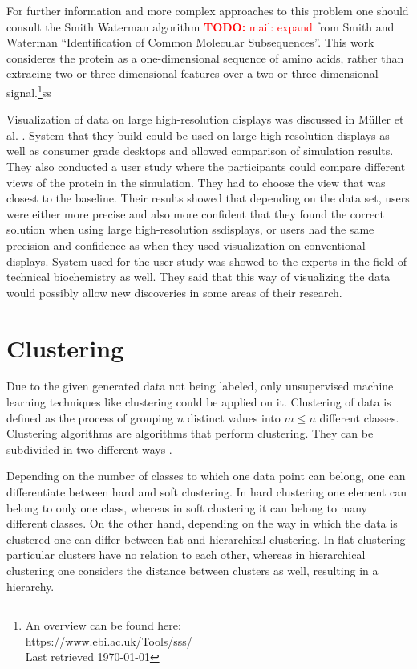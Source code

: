 \documentclass[journal]{vgtc}       %
\newcommand{\todo}[1]{\textcolor{red}{\textbf{TODO:} #1}}
\begin{document}
For further information and more complex approaches to this problem one should consult the Smith Waterman algorithm \todo{mail: expand} from Smith and Waterman ``Identification of Common Molecular Subsequences''\cite{smithwater}. This work consideres the protein as a one-dimensional sequence of amino acids, rather than extracing two or three dimensional features over a two or three dimensional signal.\footnote{An overview can be found here: \\ \url{https://www.ebi.ac.uk/Tools/sss/}\\ Last retrieved \today}ss

Visualization of data on large high-resolution displays was discussed in Müller et al. \cite{powerwall}. System that they build could be used on large high-resolution displays as well as consumer grade desktops and allowed comparison of simulation results. They also conducted a user study where the participants could compare different views of the protein in the simulation. They had to choose the view that was closest to the baseline. Their results showed that depending on the data set, users were either more precise and also more confident that they found the correct solution when using large high-resolution ssdisplays, or users had the same precision and confidence as when they used visualization on conventional displays. System used for the user study was showed to the experts in the field of technical biochemistry as well. They said that this way of visualizing the data would possibly allow new discoveries in some areas of their research.
\section{Clustering}

Due to the given generated data  not being  labeled, only unsupervised machine learning techniques like clustering could be applied on it. 
Clustering of data is defined as the process of grouping $n$ distinct values into $m \leq n$ different classes. Clustering algorithms are algorithms that perform clustering. They can be subdivided in two different ways \cite{iir}.

Depending on the number of classes to which one data point can belong, one can differentiate  between hard and soft clustering. In hard clustering one element can belong to only one class, whereas in soft clustering it can belong to many different classes.
On the other hand, depending on the way in which the data is clustered one can differ between flat and hierarchical clustering. In flat clustering particular clusters have no relation to each other, whereas in hierarchical clustering one considers the distance between clusters as well, resulting in a hierarchy.
\end{document}
